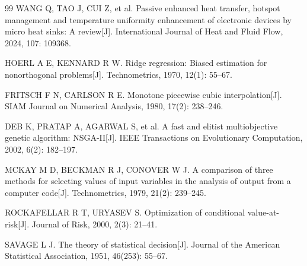 \documentclass[UTF8,12pt,a4paper]{ctexart}
\begin{document}
\begin{thebibliography}{99}
WANG Q, TAO J, CUI Z, et al. Passive enhanced heat transfer, hotspot management and temperature uniformity enhancement of electronic devices by micro heat sinks: A review[J]. International Journal of Heat and Fluid Flow, 2024, 107: 109368.

HOERL A E, KENNARD R W. Ridge regression: Biased estimation for nonorthogonal problems[J]. Technometrics, 1970, 12(1): 55--67.

FRITSCH F N, CARLSON R E. Monotone piecewise cubic interpolation[J]. SIAM Journal on Numerical Analysis, 1980, 17(2): 238--246.

DEB K, PRATAP A, AGARWAL S, et al. A fast and elitist multiobjective genetic algorithm: NSGA-II[J]. IEEE Transactions on Evolutionary Computation, 2002, 6(2): 182--197.

MCKAY M D, BECKMAN R J, CONOVER W J. A comparison of three methods for selecting values of input variables in the analysis of output from a computer code[J]. Technometrics, 1979, 21(2): 239--245.

ROCKAFELLAR R T, URYASEV S. Optimization of conditional value-at-risk[J]. Journal of Risk, 2000, 2(3): 21--41.

SAVAGE L J. The theory of statistical decision[J]. Journal of the American Statistical Association, 1951, 46(253): 55--67.
\end{thebibliography}

\appendix
\end{document}
